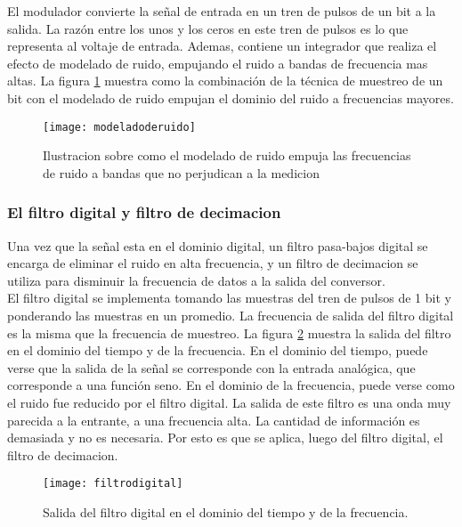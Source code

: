 El modulador convierte la señal de entrada en un tren de pulsos de un bit a la salida. La razón entre los unos y los ceros en este tren de pulsos es lo que representa al voltaje de entrada. Ademas, contiene un integrador que realiza el efecto de modelado de ruido, empujando el ruido a bandas de frecuencia mas altas. La figura \ref{fig:modeladoderuido} muestra como la combinación de la técnica de muestreo de un bit con el modelado de ruido empujan el dominio del ruido a frecuencias mayores.\cite{delta_sigma_1}

\begin{figure}[h]
  \centering
  \texttt{[image: modeladoderuido]}
  \caption{Ilustracion sobre como el modelado de ruido empuja las frecuencias de ruido a bandas que no perjudican a la medicion}\label{fig:modeladoderuido}
\end{figure}


\subsubsection{El filtro digital y filtro de decimacion} %
\label{ssub:el_filtro_digital_y_filtro_de_decimacion}

Una vez que la señal esta en el dominio digital, un filtro pasa-bajos digital se encarga de eliminar el ruido en alta frecuencia, y un filtro de decimacion se utiliza para disminuir la frecuencia de datos a la salida del conversor. \\

El filtro digital se implementa tomando las muestras del tren de pulsos de 1 bit y ponderando las muestras en un promedio. La frecuencia de salida del filtro digital es la misma que la frecuencia de muestreo. La figura \ref{fig:filtrodigital} muestra la salida del filtro en el dominio del tiempo y de la frecuencia. En el dominio del tiempo, puede verse que la salida de la señal se corresponde con la entrada analógica, que corresponde a una función seno. En el dominio de la frecuencia, puede verse como el ruido fue reducido por el filtro digital. La salida de este filtro es una onda muy parecida a la entrante, a una frecuencia alta. La cantidad de información es demasiada y no es necesaria. Por esto es que se aplica, luego del filtro digital, el filtro de decimacion. \\

\begin{figure}[h]
  \centering
  \texttt{[image: filtrodigital]}
  \caption{Salida del filtro digital en el dominio del tiempo y de la frecuencia.}\label{fig:filtrodigital}
\end{figure}

